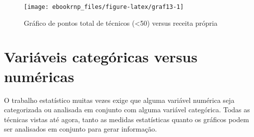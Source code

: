 \documentclass[11pt,]{style/krantz}
\makeatletter
\newenvironment{Shaded}{\begin{snugshade}}{\end{snugshade}}
\newcommand{\DataTypeTok}[1]{\textcolor[rgb]{0.13,0.29,0.53}{#1}}
\newcommand{\DecValTok}[1]{\textcolor[rgb]{0.00,0.00,0.81}{#1}}
\newcommand{\KeywordTok}[1]{\textcolor[rgb]{0.13,0.29,0.53}{\textbf{#1}}}
\newcommand{\NormalTok}[1]{#1}
\newcommand{\OperatorTok}[1]{\textcolor[rgb]{0.81,0.36,0.00}{\textbf{#1}}}
\newcommand{\StringTok}[1]{\textcolor[rgb]{0.31,0.60,0.02}{#1}}
\newenvironment{kframe}{%
\medskip{}
\setlength{\fboxsep}{.8em}
 \def\at@end@of@kframe{}%
 \ifinner\ifhmode%
  \def\at@end@of@kframe{\end{minipage}}%
  \begin{minipage}{\columnwidth}%
 \fi\fi%
 \def\FrameCommand##1{\hskip\@totalleftmargin \hskip-\fboxsep
 \colorbox{shadecolor}{##1}\hskip-\fboxsep
     \hskip-\linewidth \hskip-\@totalleftmargin \hskip\columnwidth}%
 \MakeFramed {\advance\hsize-\width
   \@totalleftmargin\z@ \linewidth\hsize
   \@setminipage}}%
 {\par\unskip\endMakeFramed%
 \at@end@of@kframe}
\renewenvironment{Shaded}{\begin{kframe}}{\end{kframe}}
\theoremstyle{definition}
\theoremstyle{definition}
\theoremstyle{definition}
\theoremstyle{remark}
\makeatother
\begin{document}
\begin{Shaded}
\end{Shaded}

\begin{figure}[H]

{\centering \texttt{[image: ebookrnp\_files/figure-latex/graf13-1]}

}

\caption{Gráfico de pontos total de técnicos (<50) versus receita própria}\label{fig:graf13}
\end{figure}

\hypertarget{variaveis-categoricas-versus-numericas}{%
\section{Variáveis categóricas versus numéricas}\label{variaveis-categoricas-versus-numericas}}

O trabalho estatístico muitas vezes exige que alguma variável numérica seja categorizada ou analisada em conjunto com alguma variável categórica. Todas as técnicas vistas até agora, tanto as medidas estatísticas quanto os gráficos podem ser analisados em conjunto para gerar informação.
\end{document}
